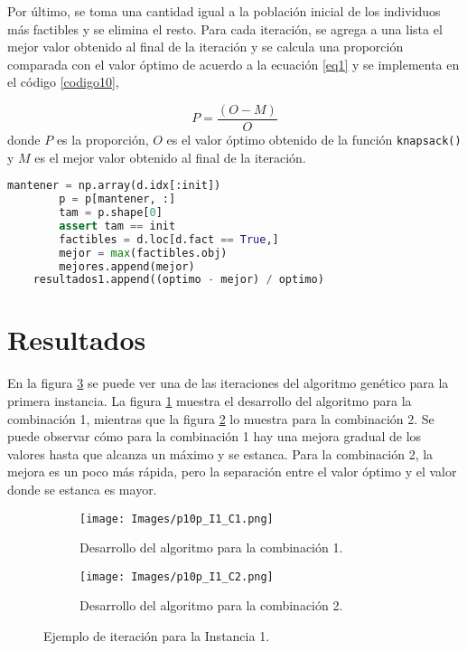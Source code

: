 \documentclass{article}
\begin{document}
Por \'ultimo, se toma una cantidad igual a la poblaci\'on inicial de los individuos m\'as factibles y se elimina el resto. Para cada iteraci\'on, se agrega a una lista el mejor valor obtenido al final de la iteraci\'on y se calcula una proporci\'on comparada con el valor \'optimo de acuerdo a la ecuaci\'on \ref{eq1} y se implementa en el c\'odigo \ref{codigo10},

\begin{equation}\label{eq1}
    P = \frac{(O - M)}{O}
\end{equation}
donde $P$ es la proporci\'on, $O$ es el valor \'optimo obtenido de la funci\'on \texttt{knapsack()} y $M$ es el mejor valor obtenido al final de la iteraci\'on.

\begin{lstlisting}[caption={Eliminaci\'on de Individuos Menos Factibles y C\'alculo de Propirci\'on}, label=codigo10, language=Python]
        mantener = np.array(d.idx[:init])
        p = p[mantener, :]
        tam = p.shape[0]
        assert tam == init
        factibles = d.loc[d.fact == True,]
        mejor = max(factibles.obj)
        mejores.append(mejor)
    resultados1.append((optimo - mejor) / optimo)
\end{lstlisting}

\section{Resultados}

En la figura \ref{fig1} se puede ver una de las iteraciones del algoritmo gen\'etico para la primera instancia. La figura \ref{fig1a} muestra el desarrollo del algoritmo para la combinaci\'on 1, mientras que la figura \ref{fig1b} lo muestra para la combinaci\'on 2. Se puede observar c\'omo para la combinaci\'on 1 hay una mejora gradual de los valores hasta que alcanza un m\'aximo y se estanca. Para la combinaci\'on 2, la mejora es un poco m\'as r\'apida, pero la separaci\'on entre el valor \'optimo y el valor donde se estanca es mayor.

\begin{figure}[h]
\centering
    \begin{subfigure}[b]{0.49\textwidth}
         \centering
         \texttt{[image: Images/p10p\_I1\_C1.png]}
         \caption{Desarrollo del algoritmo para la combinaci\'on 1.}
         \label{fig1a}
    \end{subfigure}
    \begin{subfigure}[b]{0.49\textwidth}
         \centering
         \texttt{[image: Images/p10p\_I1\_C2.png]}
         \caption{Desarrollo del algoritmo para la combinaci\'on 2.}
         \label{fig1b}
    \end{subfigure}
    \caption{Ejemplo de iteraci\'on para la Instancia 1.}
    \label{fig1}
\end{figure}
\end{document}
